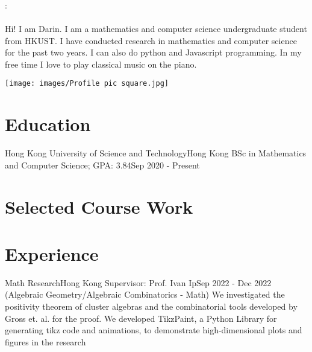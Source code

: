 \documentclass[letterpaper, 11pt]{article}
\begin{document}
\noindent\begin{minipage}{0.7\textwidth}
    \textbf{\href{https://github.com/darinchau}{\Large{\myname}}} \\ 
    \email \hspace{3pt} \myemail \\
    \github \hspace{3pt} \mygithub \\
    \phone : \mymobile \\
    \linkedin \hspace{3pt} \mylinkedin \\
    Hi! I am Darin. I am a mathematics and computer science undergraduate student from HKUST. I have conducted research in mathematics and computer science for the past two years. I can also do python and Javascript programming. In my free time I love to play classical music on the piano.
\end{minipage}

\hfill

\begin{minipage}{0.2\textwidth}
    \texttt{[image: images/Profile pic square.jpg]}
\end{minipage}


\section{Education}
\resumeSubHeadingListStart
    \resumeSubheading
        {Hong Kong University of Science and Technology}{Hong Kong}
        {BSc in Mathematics and Computer Science;    GPA: 3.84}{Sep 2020 - Present}
\resumeSubHeadingListEnd

\section{Selected Course Work}
\resumeSubHeadingListStart
\resumeSubHeadingListEnd

\section{Experience}
\resumeSubHeadingListStart
    \resumeSubheading
        {Math Research}{Hong Kong}
        {Supervisor: Prof. Ivan Ip}{Sep 2022 - Dec 2022}
        \resumeItemListStart
                {(Algebraic Geometry/Algebraic Combinatorics - Math) We investigated the positivity theorem of cluster algebras and the combinatorial tools developed by Gross et. al. for the proof.}
                {We developed TikzPaint, a Python Library for generating tikz code and animations, to demonstrate high-dimensional plots and figures in the research}
        \resumeItemListEnd
\end{document}
